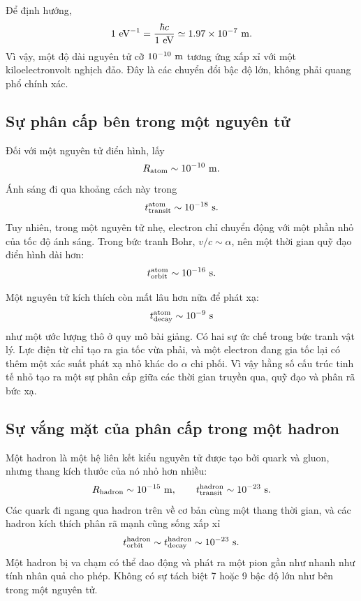 Để định hướng,
\begin{equation}
1\ {\rm eV}^{-1}
=\frac{\hbar c}{1\ {\rm eV}}
\simeq 1.97\times10^{-7}\ {\rm m}.
\end{equation}
Vì vậy, một độ dài nguyên tử cỡ \(10^{-10}\ {\rm m}\) tương ứng xấp xỉ với một kiloelectronvolt nghịch đảo. Đây là các chuyển đổi bậc độ lớn, không phải quang phổ chính xác.

\subsection{Sự phân cấp bên trong một nguyên tử}

Đối với một nguyên tử điển hình, lấy
\begin{equation}
R_{\rm atom}\sim10^{-10}\ {\rm m}.
\end{equation}
Ánh sáng đi qua khoảng cách này trong
\begin{equation}
t_{\rm transit}^{\rm atom}\sim10^{-18}\ {\rm s}.
\end{equation}
Tuy nhiên, trong một nguyên tử nhẹ, electron chỉ chuyển động với một phần nhỏ của tốc độ ánh sáng. Trong bức tranh Bohr, \(v/c\sim\alpha\), nên một thời gian quỹ đạo điển hình dài hơn:
\begin{equation}
t_{\rm orbit}^{\rm atom}\sim10^{-16}\ {\rm s}.
\end{equation}

Một nguyên tử kích thích còn mất lâu hơn nữa để phát xạ:
\begin{equation}
t_{\rm decay}^{\rm atom}\sim10^{-9}\ {\rm s}
\end{equation}
như một ước lượng thô ở quy mô bài giảng. Có hai sự ức chế trong bức tranh vật lý. Lực điện từ chỉ tạo ra gia tốc vừa phải, và một electron đang gia tốc lại có thêm một xác suất phát xạ nhỏ khác do \(\alpha\) chi phối. Vì vậy hằng số cấu trúc tinh tế nhỏ tạo ra một sự phân cấp giữa các thời gian truyền qua, quỹ đạo và phân rã bức xạ.

\subsection{Sự vắng mặt của phân cấp trong một hadron}

Một hadron là một hệ liên kết kiểu nguyên tử được tạo bởi quark và gluon, nhưng thang kích thước của nó nhỏ hơn nhiều:
\begin{equation}
R_{\rm hadron}\sim10^{-15}\ {\rm m},
\qquad
t_{\rm transit}^{\rm hadron}\sim10^{-23}\ {\rm s}.
\end{equation}
Các quark đi ngang qua hadron trên về cơ bản cùng một thang thời gian, và các hadron kích thích phân rã mạnh cũng sống xấp xỉ
\begin{equation}
t_{\rm orbit}^{\rm hadron}
\sim t_{\rm decay}^{\rm hadron}
\sim10^{-23}\ {\rm s}.
\end{equation}
Một hadron bị va chạm có thể dao động và phát ra một pion gần như nhanh như tính nhân quả cho phép. Không có sự tách biệt 7 hoặc 9 bậc độ lớn như bên trong một nguyên tử.

